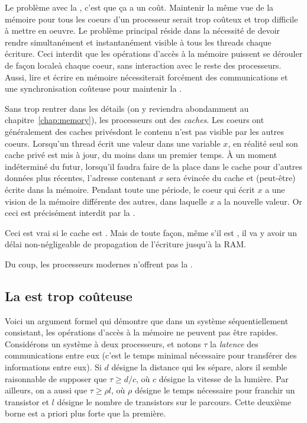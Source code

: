 Le problème avec la , c'est que ça a un
coût. Maintenir la même vue de la mémoire pour tous les coeurs d'un processeur
serait trop coûteux et trop difficile à mettre en oeuvre. Le problème principal
réside dans la nécessité de devoir rendre simultanément et instantanément
visible à tous les threads chaque écriture. Ceci interdit que les opérations
d'accès à la mémoire puissent se dérouler de façon \og locale\fg à chaque coeur,
sans interaction avec le reste des processeurs. Aussi, lire et écrire en mémoire
nécessiterait forcément des communications et une synchronisation coûteuse pour
maintenir la .

Sans trop rentrer dans les détails (on y reviendra abondamment au
chapitre~\ref{chap:memory}), les processeurs ont des \emph{caches}. Les coeurs
ont généralement des caches \og privés\fg dont le contenu n'est pas visible par
les autres coeurs. Lorsqu'un thread écrit une valeur dans une variable $x$, en
réalité seul son cache privé est mis à jour, du moins dans un premier temps. À
un moment indéterminé du futur, lorsqu'il faudra faire de la place dans le cache
pour d'autres données plus récentes, l'adresse contenant $x$ sera évincée du
cache et (peut-être) écrite dans la mémoire. Pendant toute une période, le coeur
qui écrit $x$ a une vision de la mémoire différente des autres, dans laquelle
$x$ a la nouvelle valeur. Or ceci est précisément interdit par la
.

\begin{danger}
  Ceci est vrai si le cache est . Mais de toute façon, même
  s'il est , il va y avoir un délai non-négligeable de
  propagation de l'écriture jusqu'à la RAM.
\end{danger}

Du coup, les processeurs modernes n'offrent pas la .

\subsection{La  est trop coûteuse}

Voici un argument formel qui démontre que dans un système séquentiellement
consistant, les opérations d'accès à la mémoire ne peuvent pas être
rapides. Considérons un système à deux processeurs, et notons $\tau$ la
\emph{latence} des communications entre eux (c'est le temps minimal nécessaire
pour transférer des informations entre eux). Si $d$ désigne la distance qui les
sépare, alors il semble raisonnable de supposer que $\tau \geq d/c$, où $c$
désigne la vitesse de la lumière. Par ailleurs, on a aussi que
$\tau \geq \rho l$, où $\rho$ désigne le temps nécessaire pour franchir un
transistor et $l$ désigne le nombre de transistors sur le parcours. Cette
deuxième borne est a priori plus forte que la première.

